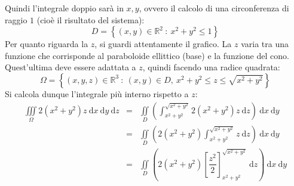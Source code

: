 \documentclass[a4paper]{article}
\begin{document}
	\noindent
	Quindi l'integrale doppio sarà in $x,y$, ovvero il calcolo di una circonferenza di raggio $1$ (cioè il risultato del sistema):
	\begin{equation*}
		D = \left\{\left(x,y\right) \in \mathbb{R}^{2} \: : \: x^{2} + y^{2} \le 1\right\}
	\end{equation*}
	Per quanto riguarda la $z$, si guardi attentamente il grafico. La $z$ varia tra una funzione che corrisponde al paraboloide ellittico (base) e la funzione del cono. Quest'ultima deve essere adattata a $z$, quindi facendo una radice quadrata:
	\begin{equation*}
		\Omega = \left\{\left(x,y,z\right) \in \mathbb{R}^{3} \: : \: \left(x,y\right) \in D, \: x^{2} + y^{2} \le z \le \sqrt{x^{2} + y^{2}}\right\}
	\end{equation*}
	Si calcola dunque l'integrale più interno rispetto a $z$:
	\begin{equation*}
		\begin{array}{rcl}
			\displaystyle\iiint\limits_{\Omega} 2\left(x^{2}+y^{2}\right)z \:\mathrm{d}x\:\mathrm{d}y\:\mathrm{d}z
			&=&
			\displaystyle\iint\limits_{D} \left(\int_{x^{2}+y^{2}}^{\sqrt{x^{2}+y^{2}}} 2\left(x^{2}+y^{2}\right)z \:\mathrm{d}z\right) \:\mathrm{d}x\:\mathrm{d}y \\ [2em]
			&=&
			\displaystyle\iint\limits_{D} \left(2\left(x^{2}+y^{2}\right)\int_{x^{2}+y^{2}}^{\sqrt{x^{2}+y^{2}}} z \:\mathrm{d}z\right) \:\mathrm{d}x\:\mathrm{d}y \\ [2em]
			&=&
			\displaystyle\iint\limits_{D} \left(2\left(x^{2}+y^{2}\right) \left[\dfrac{z^{2}}{2}\right]_{x^{2}+y^{2}}^{\sqrt{x^{2}+y^{2}}} \:\mathrm{d}z\right) \:\mathrm{d}x\:\mathrm{d}y
		\end{array}
	\end{equation*}\newpage
\end{document}
